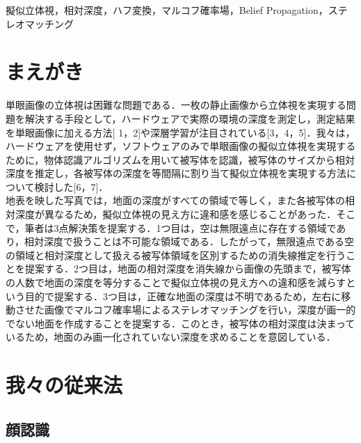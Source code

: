 \documentclass[technicalreport]{ieicej}
\begin{document}
\begin{jkeyword}
擬似立体視，相対深度，ハフ変換，マルコフ確率場，Belief Propagation，ステレオマッチング
\end{jkeyword}

\maketitle

\section{まえがき}
単眼画像の立体視は困難な問題である．一枚の静止画像から立体視を実現する問題を解決する手段として，ハードウェアで実際の環境の深度を測定し，測定結果を単眼画像に加える方法[ 1，2]や深層学習が注目されている[3，4，5]．我々は，ハードウェアを使用せず，ソフトウェアのみで単眼画像の擬似立体視を実現するために，物体認識アルゴリズムを用いて被写体を認識，被写体のサイズから相対深度を推定し，各被写体の深度を等間隔に割り当て擬似立体視を実現する方法について検討した[6，7]．\\


地表を映した写真では，地面の深度がすべての領域で等しく，また各被写体の相対深度が異なるため，擬似立体視の見え方に違和感を感じることがあった．そこで，筆者は3点解決策を提案する．1つ目は，空は無限遠点に存在する領域であり，相対深度で扱うことは不可能な領域である．したがって，無限遠点である空の領域と相対深度として扱える被写体領域を区別するための消失線推定を行うことを提案する．2つ目は，地面の相対深度を消失線から画像の先頭まで，被写体の人数で地面の深度を等分することで擬似立体視の見え方への違和感を減らすという目的で提案する．3つ目は，正確な地面の深度は不明であるため，左右に移動させた画像でマルコフ確率場によるステレオマッチングを行い，深度が画一的でない地面を作成することを提案する．このとき，被写体の相対深度は決まっているため，地面のみ画一化されていない深度を求めることを意図している．

\section{我々の従来法}
\subsection{顔認識}
\end{document}
